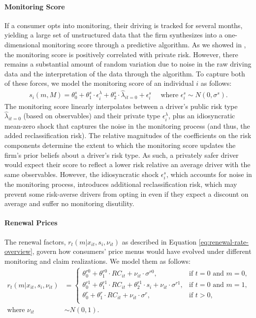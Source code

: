 \paragraph{Monitoring Score} If a consumer opts into monitoring, their driving is tracked for several months, yielding a large set of unstructured data that the firm synthesizes into a one-dimensional monitoring score through a predictive algorithm. As we showed in , the monitoring score is positively correlated with private risk. However, there remains a substantial amount of random variation due to noise in the raw driving data and the interpretation of the data through the algorithm. To capture both of these forces, we model the monitoring score of an individual $i$ as follows:
\begin{align}\label{eq:score-def-main}
     s_{i}(m, M) = \theta^{s}_0 + {\theta}^{s}_{1} \cdot \epsilon^{\lambda}_{i} + {\theta}^{s}_{2} \cdot \hat{\lambda}_{it=0} + \epsilon^{s}_{i} \quad \text{ where }\epsilon^{s}_{i} \sim N(0, \sigma^{s}).
\end{align}
The monitoring score linearly interpolates between a driver's public risk type $\hat{\lambda}_{it=0}$ (based on observables) and their private type $\epsilon^{\lambda}_{i}$, plus an idiosyncratic mean-zero shock that captures the noise in the monitoring process (and thus, the added reclassification risk). The relative magnitudes of the coefficients on the risk components determine the extent to which the monitoring score updates the firm's prior beliefs about a driver's risk type. As such, a privately safer driver would expect their score to reflect a lower risk relative an average driver with the same observables. However, the idiosyncratic shock $\epsilon^{s}_{i}$, which accounts for noise in the monitoring process, introduces additional reclassification risk, which may prevent some risk-averse drivers from opting in even if they expect a discount on average and suffer no monitoring disutility.


\paragraph{Renewal Prices}
The renewal factors, $r_t(m|x_{it},s_i,\nu_{it})$ as described in Equation \ref{eq:renewal-rate-overview}, govern how consumers' price menus would have evolved under different monitoring and claim realizations. We model them as follows:
\begin{align}\label{eq:renewal-factor-score}
r_t(m|x_{it}, s_i, \nu_{it}) & =
\begin{cases}
\theta^{r0}_0 + \theta^{r0}_1 \cdot RC_{it} + \nu_{it}\cdot \sigma^{r0}, & \text{if } t = 0\text{ and }m = 0, \\
\theta^{r1}_0 + \theta^{r1}_1 \cdot RC_{it} + \theta^{r1}_2 \cdot s_{i} + \nu_{it}\cdot \sigma^{r1}, & \text{if } t = 0\text{ and }m = 1, \\
\theta^{r}_0 + \theta^{r}_1 \cdot RC_{it} + \nu_{it}\cdot \sigma^{r}, & \text{if } t > 0, \\
\end{cases}\\
\text{where } \nu_{it} &\sim N(0, 1). \nonumber
\end{align}

